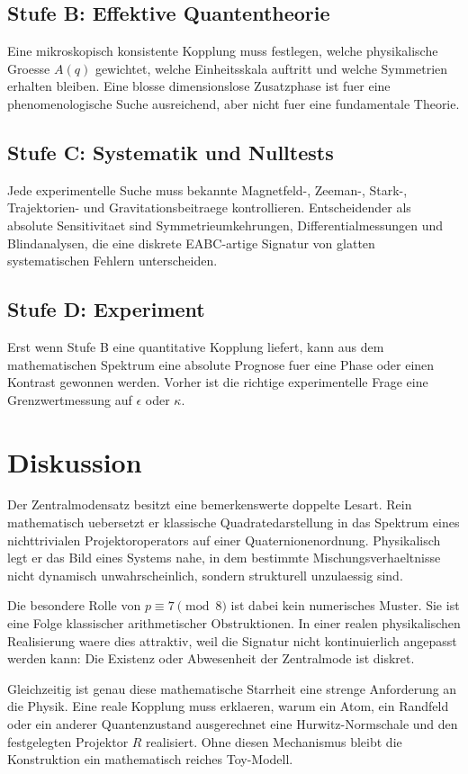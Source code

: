\documentclass[11pt,a4paper]{article}
\theoremstyle{definition}
\begin{document}
\subsection{Stufe B: Effektive Quantentheorie}
Eine mikroskopisch konsistente Kopplung muss festlegen, welche physikalische Groesse $A(q)$ gewichtet, welche Einheitsskala auftritt und welche Symmetrien erhalten bleiben. Eine blosse dimensionslose Zusatzphase ist fuer eine phenomenologische Suche ausreichend, aber nicht fuer eine fundamentale Theorie.

\subsection{Stufe C: Systematik und Nulltests}
Jede experimentelle Suche muss bekannte Magnetfeld-, Zeeman-, Stark-, Trajektorien- und Gravitationsbeitraege kontrollieren. Entscheidender als absolute Sensitivitaet sind Symmetrieumkehrungen, Differentialmessungen und Blindanalysen, die eine diskrete EABC-artige Signatur von glatten systematischen Fehlern unterscheiden.

\subsection{Stufe D: Experiment}
Erst wenn Stufe B eine quantitative Kopplung liefert, kann aus dem mathematischen Spektrum eine absolute Prognose fuer eine Phase oder einen Kontrast gewonnen werden. Vorher ist die richtige experimentelle Frage eine Grenzwertmessung auf $\epsilon$ oder $\kappa$.

\section{Diskussion}
Der Zentralmodensatz besitzt eine bemerkenswerte doppelte Lesart. Rein mathematisch uebersetzt er klassische Quadratedarstellung in das Spektrum eines nichttrivialen Projektoroperators auf einer Quaternionenordnung. Physikalisch legt er das Bild eines Systems nahe, in dem bestimmte Mischungsverhaeltnisse nicht dynamisch unwahrscheinlich, sondern strukturell unzulaessig sind.

Die besondere Rolle von $p\equiv7\pmod8$ ist dabei kein numerisches Muster. Sie ist eine Folge klassischer arithmetischer Obstruktionen. In einer realen physikalischen Realisierung waere dies attraktiv, weil die Signatur nicht kontinuierlich angepasst werden kann: Die Existenz oder Abwesenheit der Zentralmode ist diskret.

Gleichzeitig ist genau diese mathematische Starrheit eine strenge Anforderung an die Physik. Eine reale Kopplung muss erklaeren, warum ein Atom, ein Randfeld oder ein anderer Quantenzustand ausgerechnet eine Hurwitz-Normschale und den festgelegten Projektor $R$ realisiert. Ohne diesen Mechanismus bleibt die Konstruktion ein mathematisch reiches Toy-Modell.
\end{document}
